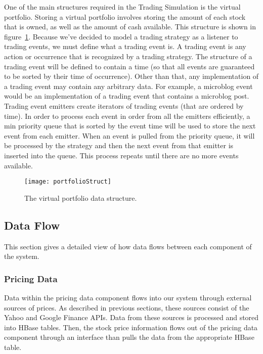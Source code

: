One of the main structures required in the Trading Simulation is the virtual portfolio.
Storing a virtual portfolio involves storing the amount of each stock that is owned, as well as the amount of cash available.
This structure is shown in figure~\ref{portfolioStruct}.
Because we've decided to model a trading strategy as a listener to trading events, we must define what a trading event is.
A trading event is any action or occurrence that is recognized by a trading strategy.
The structure of a trading event will be defined to contain a time (so that all events are guaranteed to be sorted by their time of occurrence).
Other than that, any implementation of a trading event may contain any arbitrary data.
For example, a microblog event would be an implementation of a trading event that contains a microblog post.
Trading event emitters create iterators of trading events (that are ordered by time).
In order to process each event in order from all the emitters efficiently, a min priority queue that is sorted by the event time will be used to store the next event from each emitter.
When an event is pulled from the priority queue, it will be processed by the strategy and then the next event from that emitter is inserted into the queue.
This process repeats until there are no more events available.

\begin{figure}[h]
  \label{portfolioStruct}
  \begin{center}
    \texttt{[image: portfolioStruct]}
  \end{center}
  \caption{The virtual portfolio data structure.}
\end{figure}

\subsection{Data Flow}

This section gives a detailed view of how data flows between each component of the system.

\subsubsection{Pricing Data}

Data within the pricing data component flows into our system through external sources of prices.
As described in previous sections, these sources consist of the Yahoo and Google Finance APIs.
Data from these sources is processed and stored into HBase tables.
Then, the stock price information flows out of the pricing data component through an interface than pulls the data from the appropriate HBase table.

